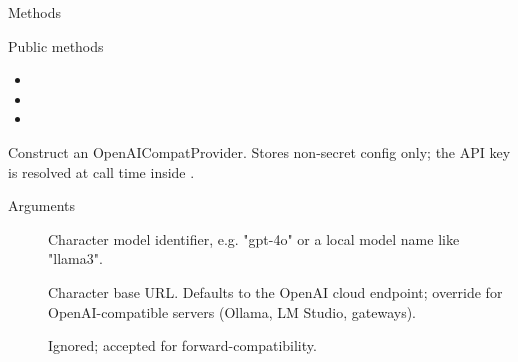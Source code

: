 \documentclass[a4paper]{book}
\begin{document}
\begin{Section}{Methods}
%
\begin{SubSection}{Public methods}
\begin{itemize}

\item{} 
\item{} 
\item{} 

\end{itemize}

\end{SubSection}



\hypertarget{method-OpenAICompatProvider-initialize}{}
%
\begin{SubSection}{}
Construct an OpenAICompatProvider. Stores non-secret config
only; the API key is resolved at call time inside .
%

%
\begin{SubSubSection}{Arguments}

\begin{description}

\item[] Character model identifier, e.g. "gpt-4o" or a local model
name like "llama3".
\item[] Character base URL. Defaults to the OpenAI cloud endpoint;
override for OpenAI-compatible servers (Ollama, LM Studio, gateways).
\item[] Ignored; accepted for forward-compatibility.

\end{description}



\end{SubSubSection}


\end{SubSection}
\end{Section}
\end{document}
